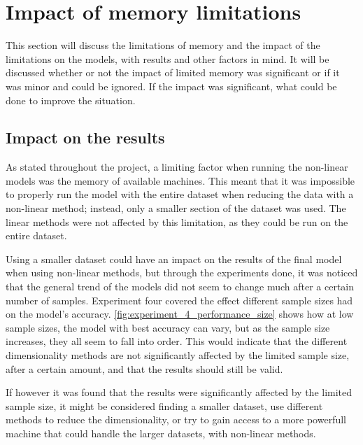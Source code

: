 \section{Impact of memory limitations}\label{sec:impact_of_memory_limitations}
This section will discuss the limitations of memory and the impact of the limitations on the models, with results and other factors in mind. It will be discussed whether or not the impact of limited memory was significant or if it was minor and could be ignored. If the impact was significant, what could be done to improve the situation. 


\subsection{Impact on the results}\label{subsec:impact_on_results}
As stated throughout the project, a limiting factor when running the non-linear models was the memory of available machines. This meant that it was impossible to properly run the model with the entire dataset when reducing the data with a non-linear method; instead, only a smaller section of the dataset was used. The linear methods were not affected by this limitation, as they could be run on the entire dataset.

Using a smaller dataset could have an impact on the results of the final model when using non-linear methods, but through the experiments done, it was noticed that the general trend of the models did not seem to change much after a certain number of samples. Experiment four covered the effect different sample sizes had on the model's accuracy. \autoref{fig:experiment_4_performance_size} shows how at low sample sizes, the model with best accuracy can vary, but as the sample size increases, they all seem to fall into order. This would indicate that the different dimensionality methods are not significantly affected by the limited sample size, after a certain amount, and that the results should still be valid.

If however it was found that the results were significantly affected by the limited sample size, it might be considered finding a smaller dataset, use different methods to reduce the dimensionality, or try to gain access to a more powerfull machine that could handle the larger datasets, with non-linear methods.


